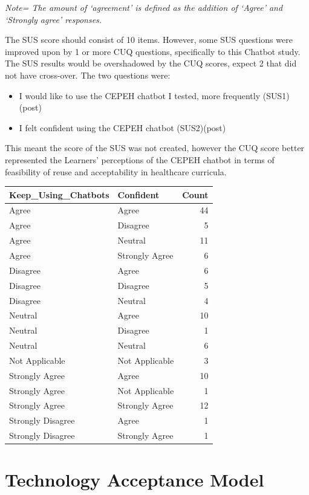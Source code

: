 \documentclass[a4paper, nobind]{templates/ociamthesis}
\providecommand{\tightlist}{%
  \setlength{\itemsep}{0pt}\setlength{\parskip}{0pt}}
\begin{document}
\emph{Note= The amount of `agreement' is defined as the addition of `Agree'
and `Strongly agree' responses.}

The SUS score should consist of 10 items. However, some SUS questions
were improved upon by 1 or more CUQ questions, specifically to this
Chatbot study. The SUS results would be overshadowed by the CUQ scores,
expect 2 that did not have cross-over. The two questions were:

\begin{itemize}
\tightlist
\item
  I would like to use the CEPEH chatbot I tested, more frequently
  (SUS1)(post)
\item
  I felt confident using the CEPEH chatbot (SUS2)(post)
\end{itemize}

This meant the score of the SUS was not created, however the CUQ score
better represented the Learners' perceptions of the CEPEH chatbot in
terms of feasibility of reuse and acceptability in healthcare curricula.

\begin{longtable}[]{@{}llr@{}}
\toprule()
Keep\_Using\_Chatbots & Confident & Count \\
\midrule()
\endhead
Agree & Agree & 44 \\
Agree & Disagree & 5 \\
Agree & Neutral & 11 \\
Agree & Strongly Agree & 6 \\
Disagree & Agree & 6 \\
Disagree & Disagree & 5 \\
Disagree & Neutral & 4 \\
Neutral & Agree & 10 \\
Neutral & Disagree & 1 \\
Neutral & Neutral & 6 \\
Not Applicable & Not Applicable & 3 \\
Strongly Agree & Agree & 10 \\
Strongly Agree & Not Applicable & 1 \\
Strongly Agree & Strongly Agree & 12 \\
Strongly Disagree & Agree & 1 \\
Strongly Disagree & Strongly Agree & 1 \\
\bottomrule()
\end{longtable}

\hypertarget{technology-acceptance-model}{%
\section{Technology Acceptance Model}\label{technology-acceptance-model}}
\end{document}
